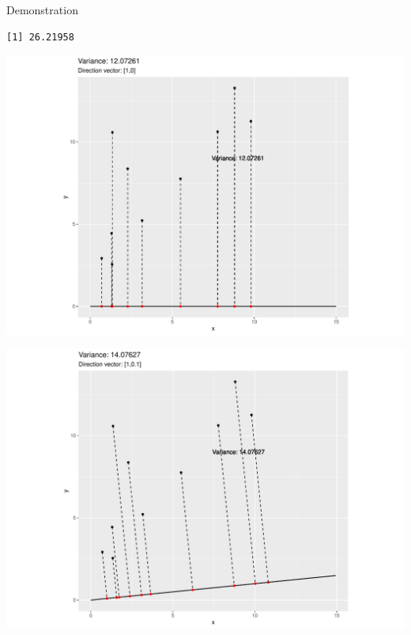 \documentclass[
  ignorenonframetext,
]{beamer}
\begin{document}
\begin{frame}[fragile]{Demonstration}
\protect\hypertarget{demonstration}{}
\begin{verbatim}
[1] 26.21958
\end{verbatim}
\end{frame}

\begin{frame}{}
\protect\hypertarget{section}{}
\includegraphics{note9_files/figure-beamer/unnamed-chunk-7-1.pdf}
\end{frame}

\begin{frame}{}
\protect\hypertarget{section-1}{}
\includegraphics{note9_files/figure-beamer/unnamed-chunk-8-1.pdf}
\end{frame}
\end{document}
